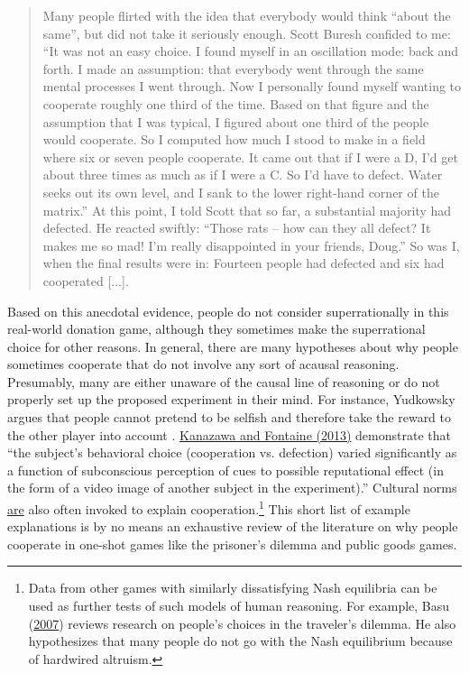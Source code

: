 \begin{quote}
Many people flirted with the idea that everybody would think ``about the
same'', but did not take it seriously enough. Scott Buresh confided to
me: ``It was not an easy choice. I found myself in an oscillation mode:
back and forth. I made an assumption: that everybody went through the
same mental processes I went through. Now I personally found myself
wanting to cooperate roughly one third of the time. Based on that figure
and the assumption that I was typical, I figured about one third of the
people would cooperate. So I computed how much I stood to make in a
field where six or seven people cooperate. It came out that if I were a
D, I'd get about three times as much as if I were a C. So I'd have to
defect. Water seeks out its own level, and I sank to the lower
right-hand corner of the matrix.'' At this point, I told Scott that so
far, a substantial majority had defected. He reacted swiftly: ``Those
rats -- how can they all defect? It makes me so mad! I'm really
disappointed in your friends, Doug.'' So was I, when the final results
were in: Fourteen people had defected and six had cooperated {[}...{]}.
\end{quote}

Based on this anecdotal evidence, people do not consider superrationally
in this real-world donation game, although they sometimes make the
superrational choice for other reasons. In general, there are many
hypotheses about why people sometimes cooperate that do not involve any
sort of acausal reasoning. Presumably, many are either unaware of the
causal line of reasoning or do not properly set up the proposed
experiment in their mind. For instance, Yudkowsky
argues that people cannot
pretend to be selfish and therefore take the reward to the other player
into account \citeyear{Yudkowsky2015-tz}.
\href{http://personal.lse.ac.uk/kanazawa/pdfs/JNPE2013.pdf}{Kanazawa
and Fontaine (2013)} demonstrate that ``the subject's behavioral choice
(cooperation vs. defection) varied significantly as a function of
subconscious perception of cues to possible reputational effect (in the
form of a video image of another subject in the experiment).'' Cultural
norms
\href{https://en.wikipedia.org/wiki/Public_goods_game\#Applications_to_sociology}{are}
also often invoked to explain cooperation.\footnote{Data from other
  games with similarly dissatisfying Nash equilibria can be used as
  further tests of such models of human reasoning. For example, Basu
  (\href{http://www.cs.virginia.edu/~robins/The_Travelers_Dilemma.pdf}{2007})
  reviews research on people's choices in the traveler's dilemma. He
  also hypothesizes that many people do not go with the Nash equilibrium
  because of hardwired altruism.} This short list of example
explanations is by no means an exhaustive review of the literature on
why people cooperate in one-shot games like the prisoner's dilemma and
public goods games.

